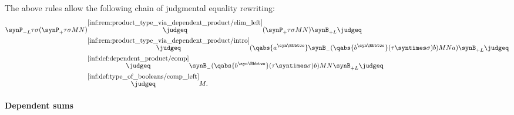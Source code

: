 \begin{remark}
  The above rules allow the following chain of judgmental equality rewriting:
  \begin{align*}
    \synP_{-L} \tau \sigma (\synP_+ \tau \sigma M N)
    &\overset {\ref{inf:rem:product_type_via_dependent_product/elim_left}} \judgeq
    (\synP_+ \tau \sigma M N) \synB_{+L}
    \judgeq \\ &\overset {\ref{inf:rem:product_type_via_dependent_product/intro}} \judgeq
    (\qabs {a^{\syn\Bbbtwo}} \synB_- (\qabs {b^{\syn\Bbbtwo}} (\tau \syntimes \sigma) b) M N a) \synB_{+L}
    \judgeq \\ &\overset {\ref{inf:def:dependent_product/comp}} \judgeq
    \synB_- (\qabs {b^{\syn\Bbbtwo}} (\tau \syntimes \sigma) b) M N \synB_{+L}
    \judgeq \\ &\overset {\ref{inf:def:type_of_booleans/comp_left}} \judgeq
    M.
  \end{align*}
\end{remark}

\paragraph{Dependent sums}

